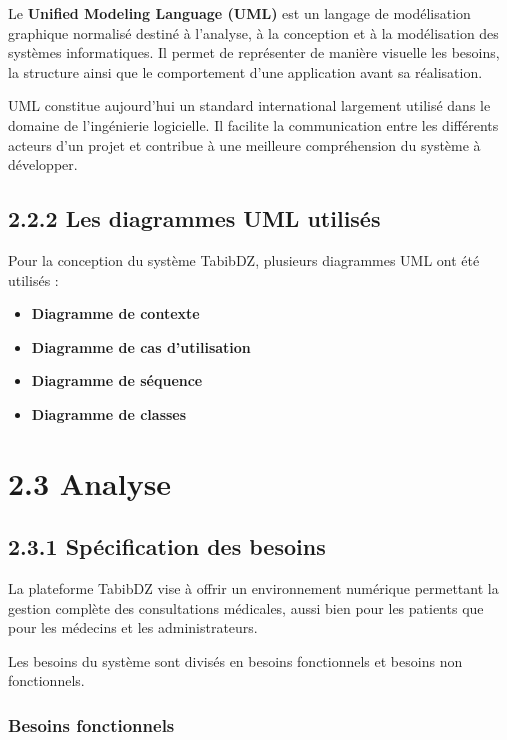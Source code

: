 \documentclass[12pt,a4paper]{report}
\begin{document}
Le \textbf{Unified Modeling Language (UML)} est un langage de mod\'elisation graphique normalis\'e destin\'e \`a l'analyse, \`a la conception et \`a la mod\'elisation des syst\`emes informatiques. Il permet de repr\'esenter de mani\`ere visuelle les besoins, la structure ainsi que le comportement d'une application avant sa r\'ealisation.

UML constitue aujourd'hui un standard international largement utilis\'e dans le domaine de l'ing\'enierie logicielle. Il facilite la communication entre les diff\'erents acteurs d'un projet et contribue \`a une meilleure compr\'ehension du syst\`eme \`a d\'evelopper.

\subsection*{2.2.2 Les diagrammes UML utilis\'es}

Pour la conception du syst\`eme TabibDZ, plusieurs diagrammes UML ont \'et\'e utilis\'es :

\begin{itemize}
    \item \textbf{Diagramme de contexte}
    \item \textbf{Diagramme de cas d'utilisation}
    \item \textbf{Diagramme de s\'equence}
    \item \textbf{Diagramme de classes}
\end{itemize}

\section*{2.3 Analyse}

\subsection*{2.3.1 Sp\'ecification des besoins}

La plateforme TabibDZ vise \`a offrir un environnement num\'erique permettant la gestion compl\`ete des consultations m\'edicales, aussi bien pour les patients que pour les m\'edecins et les administrateurs.

Les besoins du syst\`eme sont divis\'es en besoins fonctionnels et besoins non fonctionnels.

\subsubsection*{Besoins fonctionnels}
\end{document}
